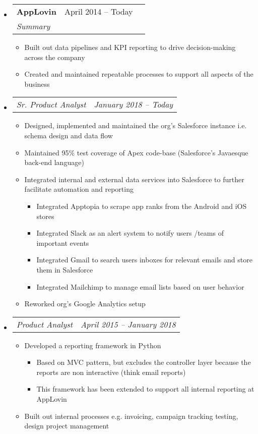 \documentclass{article}
\newcommand{\resumeheading}[1]{
    \noindent
    \fcolorbox{mygrey}{mygrey}{%
        \parbox{\dimexpr\linewidth-2\fboxsep-2\fboxrule}{\large#1}}
}
\newcommand{\splitresumesubheading}[3]{
    \begin{tabularx}{\linewidth}{XcX}
	    	\textbf{#1} & #2 \\
		    \textit{#3}
    \end{tabularx}
    \vspace{-3ex}
}
\newcommand{\resumesubsubheading}[2]{
    \begin{tabularx}{\linewidth}{Xc}
		\textit{#1} & \textit{#2} \\
    \end{tabularx}
    \vspace{-4ex}
}
\newcommand{\resumeitem}[1]{
    \item #1 
    \vspace{-2pt}
}
\begin{document}
\resumeheading{Experience}
\begin{itemize}
    \item \splitresumesubheading{AppLovin}{April 2014 -- Today}
                                {Summary}
    \begin{itemize}
        \resumeitem{Built out data pipelines and KPI reporting to drive decision-making across the company}
        \resumeitem{Created and maintained repeatable processes to support all aspects of the business}
    \end{itemize}
    \item \resumesubsubheading{Sr. Product Analyst}{January 2018 -- Today}
    \begin{itemize}
        \resumeitem{Designed, implemented and maintained the org’s Salesforce instance i.e. schema design and data flow}
        \resumeitem{Maintained 95\% test coverage of Apex code-base (Salesforce's Javaesque back-end language)}
        \resumeitem{Integrated internal and external data services into Salesforce to further facilitate automation and reporting}
        \vspace{-3ex}
        \begin{itemize}
            \resumeitem{Integrated Apptopia to scrape app ranks from the Android and iOS stores}
            \resumeitem{Integrated Slack as an alert system to notify users /teams of important events}
            \resumeitem{Integrated Gmail to search users inboxes for relevant emails and store them in Salesforce}
            \resumeitem{Integrated Mailchimp to manage email lists based on user behavior}
        \end{itemize}
        \resumeitem{Reworked org’s Google Analytics setup}
    \end{itemize}
    \item \resumesubsubheading{Product Analyst}{April 2015 -- January 2018}
    \begin{itemize}
        \resumeitem{Developed a reporting framework in Python}
        \begin{itemize}
            \resumeitem{Based on MVC pattern, but excludes the controller layer because the reports are non interactive (think email reports)}
            \resumeitem{This framework has been extended to support all internal reporting at AppLovin}
        \end{itemize}
        \resumeitem{Built out internal processes e.g. invoicing, campaign tracking testing, design project management}
    \end{itemize}

\end{itemize}
\end{document}
